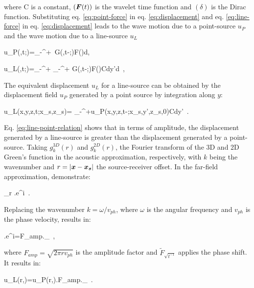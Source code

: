 \documentclass[extra,mreferee]{gji}
\begin{document}
where C is a constant, $(\mitbf{F}(t)) $ is the wavelet time function and $(\delta)$ is the Dirac function. Substituting eq. \ref{eq:point-force} in eq. \ref{eq:displacement} and eq. \ref{eq:line-force} in eq. \ref{eq:displacement} leads to the wave motion due to a point-source $u_{P}$ and the wave motion due to a line-source $u_{L}$ 

\equation
u_{P}(,t;)=\int_{-\infty}^{+\infty}\ G(,t-\tau;)F(\tau)d\tau, 
\label{eq:point-displacement}
\endequation

\equation
u_{L}(,t;)=\int_{-\infty}^{+\infty} \int_{-\infty}^{+\infty} G(,t-\tau;)F(\tau)Cdy'd\tau\ , \label{eq:line-displacement}
\endequation

The equivalent displacement $u_{L}$ for a line-source can be obtained by the displacement field $u_{P}$ generated by a point source by integration along $y$:

\equation
u_{L}(x,y,z,t;x_{s},z_{s})= \int_{-\infty}^{+\infty}u_{P}(x,y,z,t-\tau;x_{s},y',z_{s},0)Cdy'\ .
\label{eq:line-point-relation}
\endequation

Eq. \ref{eq:line-point-relation} shows that in terms of amplitude, the displacement generated by a line-source is greater than the displacement generated by a point-source.
Taking $g_{k}^{3D}(r)$ and $g_{k}^{2D}(r)$, the Fourier transform of the 3D and 2D Green's function in the acoustic approximation, respectively, with $k$ being the wavenumber and $r=|\mitbf{x}-\mitbf{x_{s}}|$ the source-receiver offset. In the far-field approximation, \cite{Forbriger_LSS_2014} demonstrate:

\equation
\lim\limits_{r \rightarrow \infty} \approx {}.e^{i}\ .
\label{eq:far-field-frac}
\endequation

Replacing the wavenumber $k=\omega/v_{ph}$, where $\omega$ is the angular frequency and $v_{ph}$ is the phase velocity, results in:

\equation
{}.\sqrt{\frac{\pi}{\omega}}e^{i}=F_{amp}._{}\ ,
\endequation

where $F_{amp}=\sqrt{2\pi r v_{ph}}$ is the amplitude factor and $\widetilde{F}_{\sqrt{t^{-1}}}$ applies the phase shift. It results in:

\equation
u_{L}(r,\omega)=u_{P}(r,\omega).F_{amp}._{}\ .
\label{eq:single-velocity}
\endequation
\end{document}
